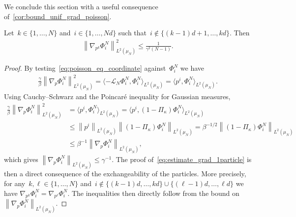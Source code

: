 \documentclass[onefignum,onetabnum]{siamart251216} %
\newcommand{\norm}[1]{\left\lVert#1\right\rVert}
\newcommand{\av}[1]{\langle #1 \rangle}
\renewcommand{\leq}{\leqslant}
\newcommand{\mescin}{\mu}
\newcommand{\projvit}{\Pi_{\kappa}}
\newcommand{\vp}[1]{p^{#1}}
\theoremstyle{plain}
\numberwithin{equation}{section}
\numberwithin{theorem}{section}
\begin{document}
We conclude this section with a useful consequence of~\cref{cor:bound_unif_grad_poisson}.
\begin{corollary}
    \label{cor:bound_unif_grad_partiel_poisson}
    Let~$k \in \{1,\dots,N\}$ and~$i \in \{1,\dots,Nd\}$ such that~$i \notin \{(k-1)d+1,\dots,kd\}$.
    Then
    \begin{align}
        \label{eq:estimate_grad_1particle}
        \left\|\nabla_{\vp{k}}\Phi_i^N\right\|_{L^2(\mescin_N)}^2 \leq \frac{1}{\gamma^2(N-1)} .
    \end{align}
\end{corollary}
\begin{proof}
    By testing~\eqref{eq:poisson_eq_coordinate} against~$\Phi_i^N$ we have
\begin{align*}
    \frac{\gamma}{\beta}\norm{\nabla_p\Phi_i^N}^2_{L^2(\mescin_N)} = \av{-\mathcal{L}_N \Phi_i^N, \Phi_i^N}_{L^2(\mescin_N)} = \av{\vp{i}, \Phi_i^N}_{L^2(\mescin_N)}.
\end{align*}
Using Cauchy--Schwarz and the Poincaré inequality for Gaussian measures,
\begin{align*}
    \frac{\gamma}{\beta}\norm{\nabla_p\Phi_i^N}^2_{L^2(\mescin_N)} & = \av{\vp{i}, \Phi_i^N}_{L^2(\mescin_N)}
     = \av{\vp{i}, (1 - \projvit){\Phi}_i^N}_{L^2(\mescin_N)}\\
    & \leq \norm{\vp{i}}_{L^2(\mescin_N)} \norm{(1 - \projvit){\Phi}_i^N}_{L^2(\mescin_N)} = \beta^{-1/2}\norm{(1 - \projvit){\Phi}_i^N}_{L^2(\mescin_N)} \\
    & \leq \beta^{-1}\norm{\nabla_p\Phi_i^N}_{L^2(\mescin_N)},
\end{align*}
which gives $\norm{\nabla_p\Phi_i^N}_{L^2(\mescin_N)} \leq \gamma^{-1}$.
The proof of~\eqref{eq:estimate_grad_1particle} is then a direct consequence of the exchangeability of the particles.
    More precisely,
    for any~$k,\ell\in \{1,\dots,N\}$ and~$i\notin \{(k-1)d,\dots,kd\} \cup \{(\ell-1)d,\dots,\ell d\}$ we have $\nabla_{\vp{k}}\Phi_i^N = \nabla_{\vp{\ell}}\Phi_i^N$.
    The inequalities then directly follow from the bound on~$\norm{\nabla_p\Phi_i^N}_{L^2(\mescin_N)}$.
\end{proof}
\end{document}
